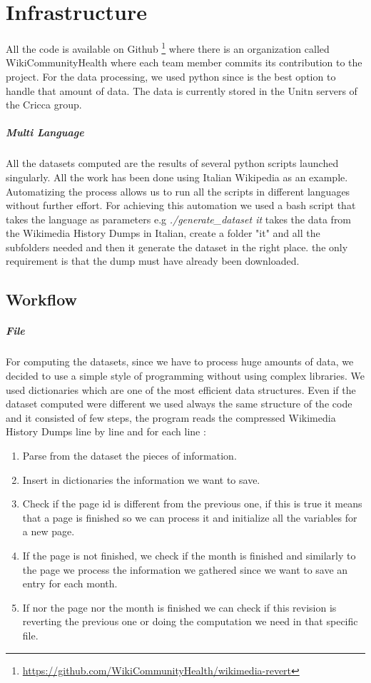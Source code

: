 \chapter{Infrastructure}

All the code is available on Github
\footnote{\url{https://github.com/WikiCommunityHealth/wikimedia-revert}} where there is an
organization called WikiCommunityHealth where each team member commits its contribution to the
project. For the data processing, we used python since is the best option to handle that amount of
data. The data is currently stored in the Unitn servers of the Cricca group.
\paragraph*{Multi Language}
All the datasets computed are the results of several python scripts launched singularly. All the
work has been done using Italian Wikipedia as an example. Automatizing the process allows us to run
all the scripts in different languages without further effort. For achieving this automation we
used a bash script that takes the language as parameters e.g \textit{./generate\_dataset it} takes
the data from the Wikimedia History Dumps in Italian, create a folder "it" and all the subfolders
needed and then it generate the dataset in the right place. the only requirement is that the dump
must have already been downloaded. 


\section{Workflow}

\paragraph{File}
For computing the datasets, since we have to process huge amounts of data, we decided to use a
simple style of programming without using complex libraries. We used dictionaries which are
one of the most efficient data structures. Even if the dataset computed were different we used
always the same structure of the code and it consisted of few steps, the program reads the compressed
Wikimedia History Dumps line by line and for each line :
\begin{enumerate}
    \item Parse from the dataset the pieces of information.
    \item Insert in dictionaries the information we want to save.
    \item Check if the page id is different from the previous one, if this is true it means that a
    page is finished so we can process it and initialize all the variables for a new page.
    \item If the page is not finished, we check if the month is finished and similarly to the page
    we process the information we gathered since we want to save an entry for each month.
    \item If nor the page nor the month is finished we can check if this revision is reverting the
    previous one or doing the computation we need in that specific file.
\end{enumerate}

